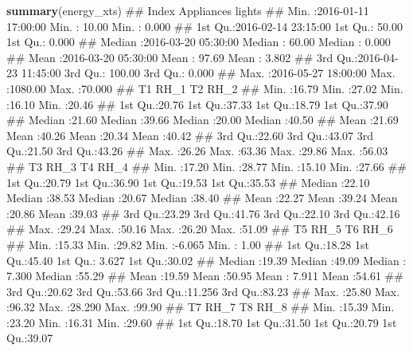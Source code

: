 \documentclass[]{article}
\newenvironment{Shaded}{\begin{snugshade}}{\end{snugshade}}
\newcommand{\KeywordTok}[1]{\textcolor[rgb]{0.13,0.29,0.53}{\textbf{#1}}}
\newcommand{\NormalTok}[1]{#1}
\begin{document}
\begin{Shaded}
\begin{Highlighting}[]
\KeywordTok{summary}\NormalTok{(energy_xts)}
\NormalTok{##      Index                       Appliances          lights      }
\NormalTok{##  Min.   :2016-01-11 17:00:00   Min.   :  10.00   Min.   : 0.000  }
\NormalTok{##  1st Qu.:2016-02-14 23:15:00   1st Qu.:  50.00   1st Qu.: 0.000  }
\NormalTok{##  Median :2016-03-20 05:30:00   Median :  60.00   Median : 0.000  }
\NormalTok{##  Mean   :2016-03-20 05:30:00   Mean   :  97.69   Mean   : 3.802  }
\NormalTok{##  3rd Qu.:2016-04-23 11:45:00   3rd Qu.: 100.00   3rd Qu.: 0.000  }
\NormalTok{##  Max.   :2016-05-27 18:00:00   Max.   :1080.00   Max.   :70.000  }
\NormalTok{##        T1             RH_1             T2             RH_2      }
\NormalTok{##  Min.   :16.79   Min.   :27.02   Min.   :16.10   Min.   :20.46  }
\NormalTok{##  1st Qu.:20.76   1st Qu.:37.33   1st Qu.:18.79   1st Qu.:37.90  }
\NormalTok{##  Median :21.60   Median :39.66   Median :20.00   Median :40.50  }
\NormalTok{##  Mean   :21.69   Mean   :40.26   Mean   :20.34   Mean   :40.42  }
\NormalTok{##  3rd Qu.:22.60   3rd Qu.:43.07   3rd Qu.:21.50   3rd Qu.:43.26  }
\NormalTok{##  Max.   :26.26   Max.   :63.36   Max.   :29.86   Max.   :56.03  }
\NormalTok{##        T3             RH_3             T4             RH_4      }
\NormalTok{##  Min.   :17.20   Min.   :28.77   Min.   :15.10   Min.   :27.66  }
\NormalTok{##  1st Qu.:20.79   1st Qu.:36.90   1st Qu.:19.53   1st Qu.:35.53  }
\NormalTok{##  Median :22.10   Median :38.53   Median :20.67   Median :38.40  }
\NormalTok{##  Mean   :22.27   Mean   :39.24   Mean   :20.86   Mean   :39.03  }
\NormalTok{##  3rd Qu.:23.29   3rd Qu.:41.76   3rd Qu.:22.10   3rd Qu.:42.16  }
\NormalTok{##  Max.   :29.24   Max.   :50.16   Max.   :26.20   Max.   :51.09  }
\NormalTok{##        T5             RH_5             T6              RH_6      }
\NormalTok{##  Min.   :15.33   Min.   :29.82   Min.   :-6.065   Min.   : 1.00  }
\NormalTok{##  1st Qu.:18.28   1st Qu.:45.40   1st Qu.: 3.627   1st Qu.:30.02  }
\NormalTok{##  Median :19.39   Median :49.09   Median : 7.300   Median :55.29  }
\NormalTok{##  Mean   :19.59   Mean   :50.95   Mean   : 7.911   Mean   :54.61  }
\NormalTok{##  3rd Qu.:20.62   3rd Qu.:53.66   3rd Qu.:11.256   3rd Qu.:83.23  }
\NormalTok{##  Max.   :25.80   Max.   :96.32   Max.   :28.290   Max.   :99.90  }
\NormalTok{##        T7             RH_7             T8             RH_8      }
\NormalTok{##  Min.   :15.39   Min.   :23.20   Min.   :16.31   Min.   :29.60  }
\NormalTok{##  1st Qu.:18.70   1st Qu.:31.50   1st Qu.:20.79   1st Qu.:39.07  }

\end{Highlighting}
\end{Shaded}
\end{document}
